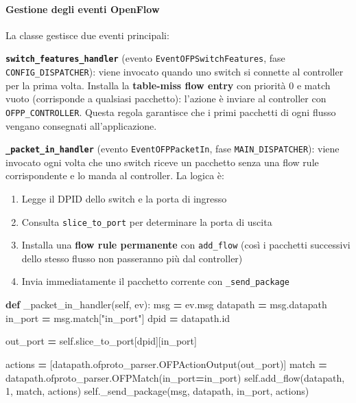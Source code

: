 \documentclass[
  italian,
  openany]{book}
\newenvironment{Shaded}{\begin{snugshade}}{\end{snugshade}}
\newcommand{\BuiltInTok}[1]{#1}
\newcommand{\DecValTok}[1]{\textcolor[rgb]{0.00,0.00,0.81}{#1}}
\newcommand{\KeywordTok}[1]{\textcolor[rgb]{0.13,0.29,0.53}{\textbf{#1}}}
\newcommand{\NormalTok}[1]{#1}
\newcommand{\OperatorTok}[1]{\textcolor[rgb]{0.81,0.36,0.00}{\textbf{#1}}}
\newcommand{\StringTok}[1]{\textcolor[rgb]{0.31,0.60,0.02}{#1}}
\newcommand{\VariableTok}[1]{\textcolor[rgb]{0.00,0.00,0.00}{#1}}
\providecommand{\tightlist}{%
  \setlength{\itemsep}{0pt}\setlength{\parskip}{0pt}}
\begin{document}
\paragraph{Gestione degli eventi
OpenFlow}\label{gestione-degli-eventi-openflow}

La classe gestisce due eventi principali:

\textbf{\texttt{switch\_features\_handler}} (evento
\texttt{EventOFPSwitchFeatures}, fase \texttt{CONFIG\_DISPATCHER}):
viene invocato quando uno switch si connette al controller per la prima
volta. Installa la \textbf{table-miss flow entry} con priorità 0 e match
vuoto (corrisponde a qualsiasi pacchetto): l'azione è inviare al
controller con \texttt{OFPP\_CONTROLLER}. Questa regola garantisce che i
primi pacchetti di ogni flusso vengano consegnati all'applicazione.

\textbf{\texttt{\_packet\_in\_handler}} (evento
\texttt{EventOFPPacketIn}, fase \texttt{MAIN\_DISPATCHER}): viene
invocato ogni volta che uno switch riceve un pacchetto senza una flow
rule corrispondente e lo manda al controller. La logica è:

\begin{enumerate}
\def\labelenumi{\arabic{enumi}.}
\tightlist
\item
  Legge il DPID dello switch e la porta di ingresso
\item
  Consulta \texttt{slice\_to\_port} per determinare la porta di uscita
\item
  Installa una \textbf{flow rule permanente} con \texttt{add\_flow}
  (così i pacchetti successivi dello stesso flusso non passeranno più
  dal controller)
\item
  Invia immediatamente il pacchetto corrente con
  \texttt{\_send\_package}
\end{enumerate}

\begin{Shaded}
\begin{Highlighting}[]
\KeywordTok{def}\NormalTok{ \_packet\_in\_handler(}\VariableTok{self}\NormalTok{, ev):}
\NormalTok{    msg }\OperatorTok{=}\NormalTok{ ev.msg}
\NormalTok{    datapath }\OperatorTok{=}\NormalTok{ msg.datapath}
\NormalTok{    in\_port }\OperatorTok{=}\NormalTok{ msg.match[}\StringTok{"in\_port"}\NormalTok{]}
\NormalTok{    dpid }\OperatorTok{=}\NormalTok{ datapath.}\BuiltInTok{id}

\NormalTok{    out\_port }\OperatorTok{=} \VariableTok{self}\NormalTok{.slice\_to\_port[dpid][in\_port]}

\NormalTok{    actions }\OperatorTok{=}\NormalTok{ [datapath.ofproto\_parser.OFPActionOutput(out\_port)]}
\NormalTok{    match }\OperatorTok{=}\NormalTok{ datapath.ofproto\_parser.OFPMatch(in\_port}\OperatorTok{=}\NormalTok{in\_port)}
    \VariableTok{self}\NormalTok{.add\_flow(datapath, }\DecValTok{1}\NormalTok{, match, actions)}
    \VariableTok{self}\NormalTok{.\_send\_package(msg, datapath, in\_port, actions)}
\end{Highlighting}
\end{Shaded}
\end{document}
